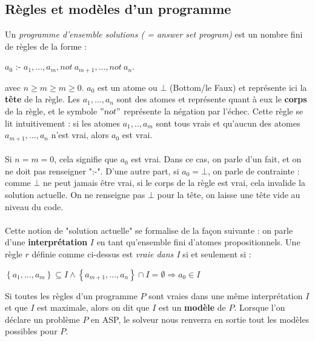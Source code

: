 \documentclass[12pt,a4paper]{article}
\begin{document}
\subsection{Règles et modèles d'un programme}
Un \emph{programme d'ensemble solutions ( = answer set program)} est un nombre fini de règles de la forme :

\begin{center}
$a_0$ :- $a_1,...,a_m,not \: a_{m+1},...,not \: a_n.$
\end{center}
avec $n\geq m\geq m\geq 0$. $a_0$ est un atome ou $\bot$ (Bottom/le Faux) et représente ici la \textbf{tête} de la règle. Les $a_1,...,a_n$ sont des atomes et représente quant à eux le \textbf{corps} de la règle, et le symbole $"not"$ 
représente la négation par l'échec. Cette règle se lit intuitivement : si les atomes $a_1,..,a_m$ sont tous vrais et qu'aucun des atomes $a_{m+1},...,a_n$ n'est vrai, alors $a_0$ est vrai.\\ \\
Si $n=m=0$, cela signifie que $a_0$ est vrai. Dans ce cas, on parle d'un fait, et on ne doit pas renseigner ":-". D'une autre part, si $a_0=\bot$, on parle de contrainte : comme $\bot$ ne peut jamais être vrai, si le corps de la 
règle est vrai, cela 
invalide la solution actuelle. On ne renseigne pas $\bot$ pour la tête, on laisse une tête vide au niveau du code.\\ \\
Cette notion de "solution actuelle" se formalise de la façon suivante : on parle d'une \textbf{interprétation} $I$ en tant qu'ensemble fini d'atomes propositionnels. Une règle $r$ définie comme ci-dessus est \emph{vraie dans I} si 
et seulement si :

\begin{center}
$\left\{a_1,...,a_m\right\}\subseteq I \wedge \left\{a_{m+1},...,a_n\right\} \cap I = \emptyset \Rightarrow a_0 \in I$
\end{center}

Si toutes les règles d'un programme $P$ sont vraies dans une même interprétation $I$ et que $I$ est maximale, alors on dit que $I$ est un \textbf{modèle} de $P$. Lorsque l'on déclare un problème $P$ en ASP, le solveur nous renverra en sortie tout 
les modèles possibles pour $P$.
\end{document}
